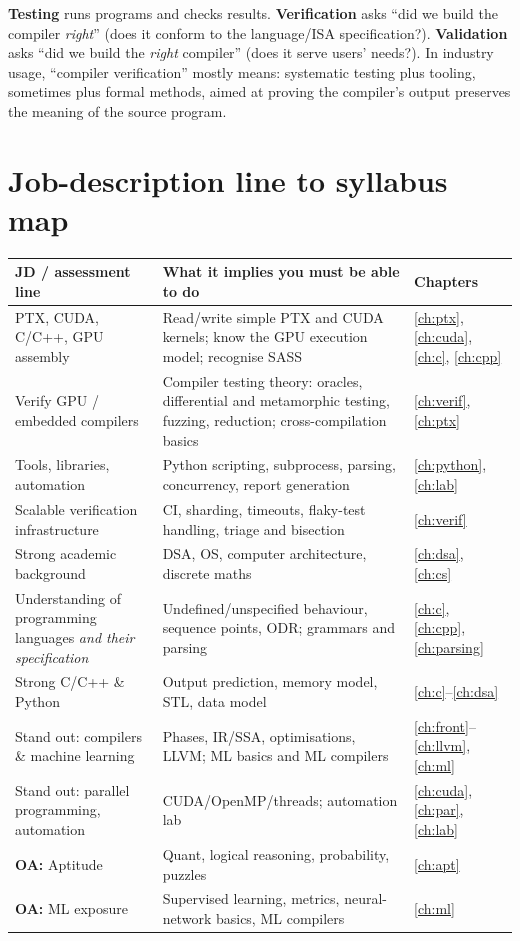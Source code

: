 \documentclass[10pt,a4paper,openany,oneside]{report}
\newcommand{\prio}[1]{\texorpdfstring{\ifcase#1\or{\color{gold}\ding{72}}\or{\color{gold}\ding{72}\ding{72}}\or{\color{gold}\ding{72}\ding{72}\ding{72}}\fi}{}}
\begin{document}
\begin{defbox}
\textbf{Testing} runs programs and checks results. \textbf{Verification} asks ``did we build the compiler \emph{right}'' (does it conform to the
language/ISA specification?). \textbf{Validation} asks ``did we build the \emph{right} compiler'' (does it serve users' needs?). In industry
usage, ``compiler verification'' mostly means: systematic testing plus tooling, sometimes plus formal methods, aimed at proving the
compiler's output preserves the meaning of the source program.
\end{defbox}

\section{Job-description line to syllabus map \prio{3}}
\begin{center}
\small
\begin{xltabular}{\textwidth}{@{}L{4.6cm}Y L{2.4cm}@{}}
\toprule
\textbf{JD / assessment line} & \textbf{What it implies you must be able to do} & \textbf{Chapters}\\
\midrule\endhead
PTX, CUDA, C/C++, GPU assembly & Read/write simple PTX and CUDA kernels; know the GPU execution model; recognise SASS & \ref{ch:ptx}, \ref{ch:cuda}, \ref{ch:c}, \ref{ch:cpp}\\
Verify GPU / embedded compilers & Compiler testing theory: oracles, differential and metamorphic testing, fuzzing, reduction; cross-compilation basics & \ref{ch:verif}, \ref{ch:ptx}\\
Tools, libraries, automation & Python scripting, subprocess, parsing, concurrency, report generation & \ref{ch:python}, \ref{ch:lab}\\
Scalable verification infrastructure & CI, sharding, timeouts, flaky-test handling, triage and bisection & \ref{ch:verif}\\
Strong academic background & DSA, OS, computer architecture, discrete maths & \ref{ch:dsa}, \ref{ch:cs}\\
Understanding of programming languages \emph{and their specification} & Undefined/unspecified behaviour, sequence points, ODR; grammars and parsing & \ref{ch:c}, \ref{ch:cpp}, \ref{ch:parsing}\\
Strong C/C++ \& Python & Output prediction, memory model, STL, data model & \ref{ch:c}--\ref{ch:dsa}\\
Stand out: compilers \& machine learning & Phases, IR/SSA, optimisations, LLVM; ML basics and ML compilers & \ref{ch:front}--\ref{ch:llvm}, \ref{ch:ml}\\
Stand out: parallel programming, automation & CUDA/OpenMP/threads; automation lab & \ref{ch:cuda}, \ref{ch:par}, \ref{ch:lab}\\
\textbf{OA:} Aptitude & Quant, logical reasoning, probability, puzzles & \ref{ch:apt}\\
\textbf{OA:} ML exposure & Supervised learning, metrics, neural-network basics, ML compilers & \ref{ch:ml}\\
\bottomrule
\end{xltabular}
\end{center}
\end{document}
